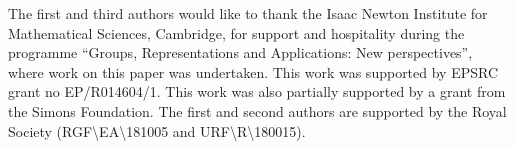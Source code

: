 \documentclass[11pt,a4paper]{article}
\theoremstyle{definition}
\theoremstyle{remark}
\begin{document}
The first and third authors would like to thank the Isaac Newton Institute for Mathematical Sciences, Cambridge, for support and hospitality during the programme “Groups, Representations and Applications: New perspectives”, where work on this paper was undertaken. This work was supported by EPSRC grant no EP/R014604/1.
This work was also partially supported by a grant from the Simons Foundation. 
The first and second authors are supported by the Royal Society (RGF\textbackslash EA\textbackslash181005 and URF\textbackslash R\textbackslash180015). 

\newpage
\end{document}
